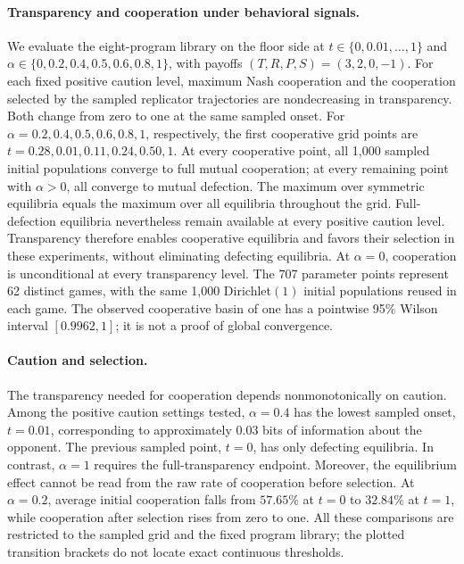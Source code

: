 
\paragraph{Transparency and cooperation under behavioral signals.}
We evaluate the eight-program library on the floor side at
$t\in\{0,0.01,\ldots,1\}$ and
$\alpha\in\{0,0.2,0.4,0.5,0.6,0.8,1\}$, with payoffs
$(T,R,P,S)=(3,2,0,-1)$. For each fixed positive caution level, maximum Nash
cooperation and the cooperation selected by the sampled replicator trajectories
are nondecreasing in transparency. Both change from zero to one at the same
sampled onset. For $\alpha=0.2,0.4,0.5,0.6,0.8,1$, respectively, the first
cooperative grid points are $t=0.28,0.01,0.11,0.24,0.50,1$.
At every cooperative point, all 1,000 sampled initial populations converge to
full mutual cooperation; at every remaining point with $\alpha>0$, all converge
to mutual defection. The maximum over symmetric equilibria equals the maximum
over all equilibria throughout the grid. Full-defection equilibria nevertheless
remain available at every positive caution level. Transparency therefore
enables cooperative equilibria and favors their selection in these experiments,
without eliminating defecting equilibria. At $\alpha=0$, cooperation is
unconditional at every transparency level. The 707 parameter points represent
62 distinct games, with the same 1,000 Dirichlet$(1)$ initial populations reused
in each game. The observed cooperative basin of one has a pointwise 95\%
Wilson interval $[0.9962,1]$; it is not a proof of global convergence.

\paragraph{Caution and selection.}
The transparency needed for cooperation depends nonmonotonically on caution.
Among the positive caution settings tested, $\alpha=0.4$ has the lowest sampled
onset, $t=0.01$, corresponding to approximately $0.03$ bits of information about
the opponent. The previous sampled point, $t=0$, has only defecting equilibria.
In contrast, $\alpha=1$ requires the full-transparency endpoint. Moreover, the
equilibrium effect cannot be read from the raw rate of cooperation before
selection. At $\alpha=0.2$, average initial cooperation falls from $57.65\%$ at
$t=0$ to $32.84\%$ at $t=1$, while cooperation after selection rises from zero
to one. All these comparisons are restricted to the sampled grid and the fixed
program library; the plotted transition brackets do not locate exact
continuous thresholds.

